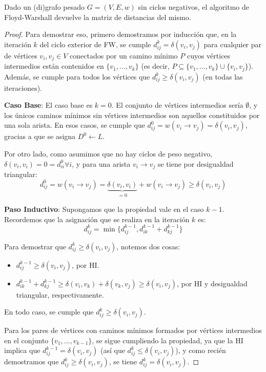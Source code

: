 \begin{theorem*}
    Dado un (di)grafo pesado $G = (V, E, w)$ sin ciclos negativos, el algoritmo de Floyd-Warshall devuelve la matriz de distancias del mismo.
\end{theorem*}
\begin{proof}
    Para demostrar eso, primero demostramos por inducción que, en la iteración $k$ del ciclo exterior de FW, se cumple $d^k_{ij} = \delta(v_i, v_j)$ para cualquier par de vértices $v_i, v_j \in V$ conectados por un camino mínimo $P$ cuyos vértices intermedios están contenidos en $\{v_1, ..., v_k\}$ (es decir, $P \subseteq \{v_1, ..., v_k\} \cup \{v_i, v_j\}$). Además, se cumple para todos los vértices que $d^k_{ij} \geq \delta(v_i, v_j)$ (en todas las iteraciones).

    \textbf{Caso Base}: El caso base es $k = 0$. El conjunto de vértices intermedios sería $\emptyset$, y los únicos caminos mínimos sin vértices intermedios son aquellos constituidos por una sola arista. En esos casos, se cumple que $d^0_{ij} = w(v_i \rightarrow v_j) = \delta(v_i, v_j)$, gracias a que se asigna $D^0 \gets L$.

    Por otro lado, como asumimos que no hay ciclos de peso negativo, $\delta(v_i, v_i) = 0 = d^0_{ii} \forall i$, y para una arista $v_i \rightarrow v_j$ se tiene por desigualdad triangular:
    $$d^0_{ij} = w(v_i \rightarrow v_j) = \underbrace{{\delta(v_i, v_i)}}_{= 0} + w(v_i \rightarrow v_j) \geq \delta(v_i, v_j)$$

    \textbf{Paso Inductivo}: Supongamos que la propiedad vale en el caso $k - 1$. Recordemos que la asignación que se realiza en la iteración $k$ es:
    $$d^k_{ij} = \min{\{d^{k - 1}_{ij}, d^{k - 1}_{ik} + d^{k - 1}_{kj}\}}$$

    Para demostrar que $d^k_{ij} \geq \delta(v_i, v_j)$, notemos dos cosas:
    \begin{itemize}
        \item $d^{k - 1}_{ij} \geq \delta(v_i, v_j)$, por HI.
        \item $d^{k - 1}_{ik} + d^{k - 1}_{kj} \geq \delta(v_i, v_k) + \delta(v_k, v_j) \geq \delta(v_i, v_j)$, por HI y desigualdad triangular, respectivamente.
    \end{itemize}

    En todo caso, se cumple que $d^k_{ij} \geq \delta(v_i, v_j)$.

    Para los pares de vértices con caminos mínimos formados por vértices intermedios en el conjunto $\{v_1, ..., v_{k - 1}\}$, se sigue cumpliendo la propiedad, ya que la HI implica que $d^{k - 1}_{ij} = \delta(v_i, v_j)$ (así que $d^k_{ij} \leq \delta(v_i, v_j)$), y como recién demostramos que $d^k_{ij} \geq \delta(v_i, v_j)$, se tiene $d^k_{ij} = \delta(v_i, v_j)$.


\end{proof}
